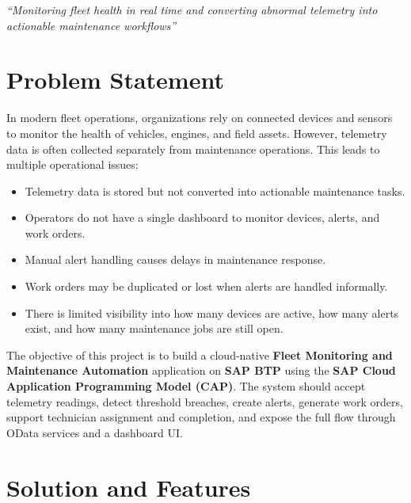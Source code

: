 \documentclass[a4paper,12pt]{article}
\begin{document}
\begin{center}

  \vspace{6mm}
  {\small\color{darkgray}\itshape
    ``Monitoring fleet health in real time and converting abnormal telemetry into actionable maintenance workflows''}
\end{center}

\newpage
\setcounter{page}{1}

\section{Problem Statement}

In modern fleet operations, organizations rely on connected devices and sensors to monitor the health of vehicles, engines, and field assets. However, telemetry data is often collected separately from maintenance operations. This leads to multiple operational issues:

\begin{itemize}[leftmargin=1.5em, itemsep=3pt]
  \item Telemetry data is stored but not converted into actionable maintenance tasks.
  \item Operators do not have a single dashboard to monitor devices, alerts, and work orders.
  \item Manual alert handling causes delays in maintenance response.
  \item Work orders may be duplicated or lost when alerts are handled informally.
  \item There is limited visibility into how many devices are active, how many alerts exist, and how many maintenance jobs are still open.
\end{itemize}

The objective of this project is to build a cloud-native \textbf{Fleet Monitoring and Maintenance Automation} application on \textbf{SAP BTP} using the \textbf{SAP Cloud Application Programming Model (CAP)}. The system should accept telemetry readings, detect threshold breaches, create alerts, generate work orders, support technician assignment and completion, and expose the full flow through OData services and a dashboard UI.

\section{Solution and Features}
\end{document}
